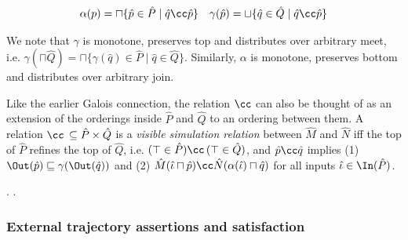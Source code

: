 \begin{align*}
\alpha(p) = \sqcap \{ \hat p \in \hat P \mid \hat q \cc \hat p \} && \gamma(\hat p) = \sqcup \{ \hat q \in \hat Q \mid \hat q \cc \hat p \}
\end{align*}

\noindent We note that $\gamma$ is monotone, preserves top and distributes over arbitrary meet, i.e. $\gamma(\sqcap \hat Q) = \sqcap \{ \gamma(\hat q) \in \hat P \mid \hat q \in \hat Q\}$. Similarly, $\alpha$ is monotone, preserves bottom and distributes over arbitrary join.

Like the earlier Galois connection, the relation $\cc$ can also be thought of as an extension of the orderings inside $\hat P$ and $\hat Q$ to an ordering between them. A relation $\cc \, \subseteq \hat P \times \hat Q$ is a \textit{visible simulation relation} between $\hat M$ and $\hat N$ iff the top of $\hat P$ refines the top of $\hat Q$, i.e. $(\top \in \hat P) \cc \, (\top \in \hat Q)$, and $\hat p \cc \hat q$ implies (1) $\Out(\hat p) \sqsubseteq \gamma(\Out(\hat q))$ and (2) $\hat M(\hat \iota \sqcap \hat p) \cc \hat N(\alpha(\hat \iota) \sqcap \hat q)$ for all inputs $\hat \iota \in \In(\hat P)$.


. .

\subsubsection{External trajectory assertions and satisfaction}

